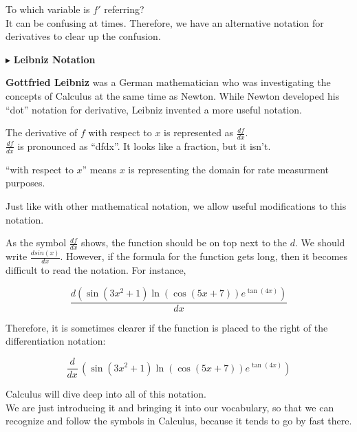 \documentclass{ximera}
\begin{document}
To which variable is $f'$ referring? \\






It can be confusing at times.  Therefore, we have an alternative notation for derivatives to clear up the confusion.



$\blacktriangleright$  \textbf{\textcolor{purple!85!blue}{Leibniz Notation}}


\textbf{Gottfried Leibniz} was a German mathematician who was investigating the concepts of Calculus at the same time as Newton.  While Newton developed his ``dot'' notation for derivative, Leibniz invented a more useful notation.


The derivative of $f$ with respect to $x$ is represented as $\frac{df}{dx}$. \\

$\frac{df}{dx}$ is pronounced as ``dfdx''.  It looks like a fraction, but it isn't.


``with respect to $x$'' means $x$ is representing the domain for rate measurment purposes. 



\begin{notation}


Just like with other mathematical notation, we allow useful modifications to this notation.



As the symbol $\frac{df}{dx}$ shows, the function should be on top next to the $d$.    We should write $\frac{d sin(x)}{dx}$.  However, if the formula for the function gets long, then it becomes difficult to read the notation. For instance,

\[
\frac{d (\sin(3x^2+1)\ln(\cos(5x+7))e^{\tan(4x)})}{dx}
\]


Therefore, it is sometimes clearer if the function is placed to the right of the differentiation notation:




\[
\frac{d}{dx} \, (\sin(3x^2+1)\ln(\cos(5x+7))e^{\tan(4x)})
\]






\end{notation}




Calculus will dive deep into all of this notation. \\

We are just introducing it and bringing it into our vocabulary, so that we can recognize and follow the symbols in Calculus, because it tends to go by fast there.
\end{document}
